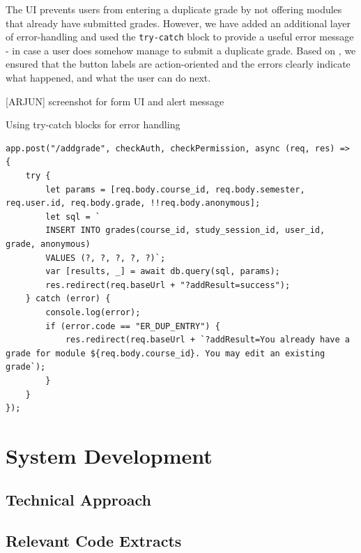 The UI prevents users from entering a duplicate grade by not offering modules that already have submitted grades. However, we have added an additional layer of error-handling and used the \texttt{try-catch} block to provide a useful error message - in case a user does somehow manage to submit a duplicate grade. Based on \cite{mckay_2013}, we ensured that the button labels are action-oriented and the errors clearly indicate what happened, and what the user can do next.

[ARJUN] screenshot for form UI and alert message

\begin{listing}[H]
	\caption{Using try-catch blocks for error handling}
	\label{lis:trycatch}
	\begin{verbatim}
app.post("/addgrade", checkAuth, checkPermission, async (req, res) => {
	try {
		let params = [req.body.course_id, req.body.semester, req.user.id, req.body.grade, !!req.body.anonymous];
		let sql = `
		INSERT INTO grades(course_id, study_session_id, user_id, grade, anonymous)
		VALUES (?, ?, ?, ?, ?)`;
		var [results, _] = await db.query(sql, params);
		res.redirect(req.baseUrl + "?addResult=success");
	} catch (error) {
		console.log(error);
		if (error.code == "ER_DUP_ENTRY") {
			res.redirect(req.baseUrl + `?addResult=You already have a grade for module ${req.body.course_id}. You may edit an existing grade`);
		}
	}
});
	\end{verbatim}
\end{listing}


\section{System Development}

\subsection{Technical Approach}\label{sec:techapproach}


\subsection{Relevant Code Extracts}\label{sec:code}

\begin{listing}[H]
	\caption{}
	\label{lis:}
	\begin{verbatim}

	\end{verbatim}
\end{listing}

